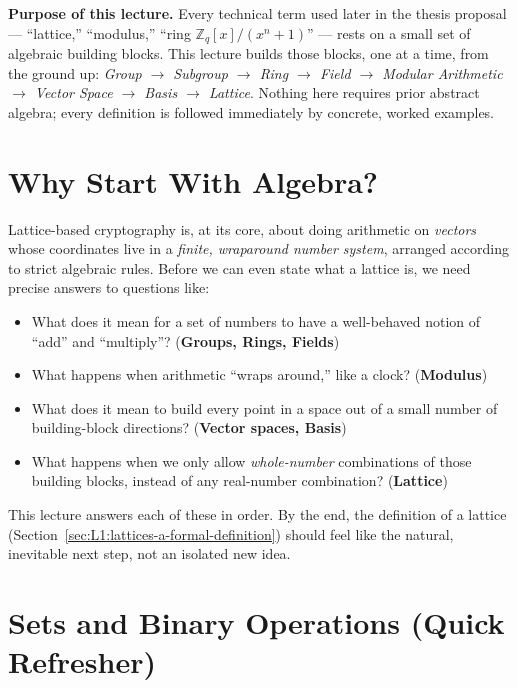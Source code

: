 \begin{notebox}
\small\textbf{Purpose of this lecture.} Every technical term used later in the thesis proposal --- ``lattice,'' ``modulus,'' ``ring $\mathbb{Z}_q[x]/(x^n+1)$'' --- rests on a small set of algebraic building blocks. This lecture builds those blocks, one at a time, from the ground up: \emph{Group $\to$ Subgroup $\to$ Ring $\to$ Field $\to$ Modular Arithmetic $\to$ Vector Space $\to$ Basis $\to$ Lattice}. Nothing here requires prior abstract algebra; every definition is followed immediately by concrete, worked examples.
\end{notebox}

\section{Why Start With Algebra?}
\label{sec:L1:why-start-with-algebra}

Lattice-based cryptography is, at its core, about doing arithmetic on \emph{vectors} whose coordinates live in a \emph{finite, wraparound number system}, arranged according to strict algebraic rules. Before we can even state what a lattice is, we need precise answers to questions like:
\begin{itemize}[leftmargin=*]
  \item What does it mean for a set of numbers to have a well-behaved notion of ``add'' and ``multiply''? (\textbf{Groups, Rings, Fields})
  \item What happens when arithmetic ``wraps around,'' like a clock? (\textbf{Modulus})
  \item What does it mean to build every point in a space out of a small number of building-block directions? (\textbf{Vector spaces, Basis})
  \item What happens when we only allow \emph{whole-number} combinations of those building blocks, instead of any real-number combination? (\textbf{Lattice})
\end{itemize}
This lecture answers each of these in order. By the end, the definition of a lattice (Section~\ref{sec:L1:lattices-a-formal-definition}) should feel like the natural, inevitable next step, not an isolated new idea.

\section{Sets and Binary Operations (Quick Refresher)}
\label{sec:L1:sets-and-binary-operations-quick-refresh}

